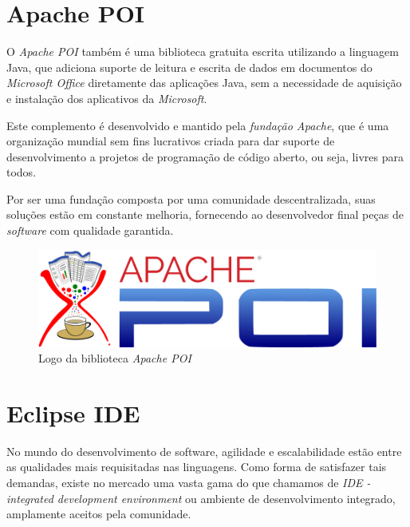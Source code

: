\documentclass[
	12pt,			%
	openright,		%
	oneside,	
	a4paper,		%
	english,		%
	brazil			%
]{abntex2/abntex2}  %
\begin{document}
		\section{Apache POI} \label{apache-poi}
		
			O \textit{Apache POI} \cite{poi} também é uma biblioteca gratuita escrita utilizando a linguagem Java, que adiciona suporte de leitura e escrita de dados em documentos do \textit{Microsoft Office} diretamente das aplicações Java, sem a necessidade de aquisição e instalação dos aplicativos da \textit{Microsoft}.
			
			Este complemento é desenvolvido e mantido pela \textit{fundação Apache}, que é uma organização mundial sem fins lucrativos criada para dar suporte de desenvolvimento a projetos de programação de código aberto, ou seja, livres para todos.
			
			Por ser uma fundação composta por uma comunidade descentralizada, suas soluções estão em constante melhoria, fornecendo ao desenvolvedor final peças de \textit{software} com qualidade garantida.
			
			\begin{figure}[ht]
				\begin{center}
					
					\caption{Logo da biblioteca \textit{Apache POI}}
					\label{apache-poi-img}
					
					\includegraphics[scale=0.35]{img/apache-poi}
					
					
				\end{center}
			\end{figure}
		
		\section{Eclipse IDE} \label{eclipse-ide}
		
			No mundo do desenvolvimento de software, agilidade e escalabilidade estão entre as qualidades mais requisitadas nas linguagens. Como forma de satisfazer tais demandas, existe no mercado uma vasta gama do que chamamos de \textit{IDE - integrated development environment} ou ambiente de desenvolvimento integrado, amplamente aceitos pela comunidade.
			
\end{document}
